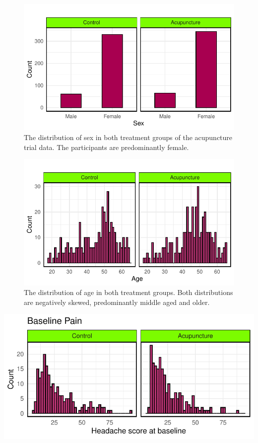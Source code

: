 \documentclass{article}
\newcommand{\pandocbounded}[1]{#1}
\begin{document}
\begin{figure}
\centering
\pandocbounded{\includegraphics[keepaspectratio]{Final_Report_files/figure-latex/unnamed-chunk-9-1.pdf}}
\caption{The distribution of sex in both treatment groups of the
acupuncture trial data. The participants are predominantly female.}
\end{figure}

\begin{figure}
\centering
\pandocbounded{\includegraphics[keepaspectratio]{Final_Report_files/figure-latex/unnamed-chunk-10-1.pdf}}
\caption{The distribution of age in both treatment groups. Both
distributions are negatively skewed, predominantly middle aged and
older.}
\end{figure}

\pandocbounded{\includegraphics[keepaspectratio]{Final_Report_files/figure-latex/unnamed-chunk-11-1.pdf}}
\end{document}

